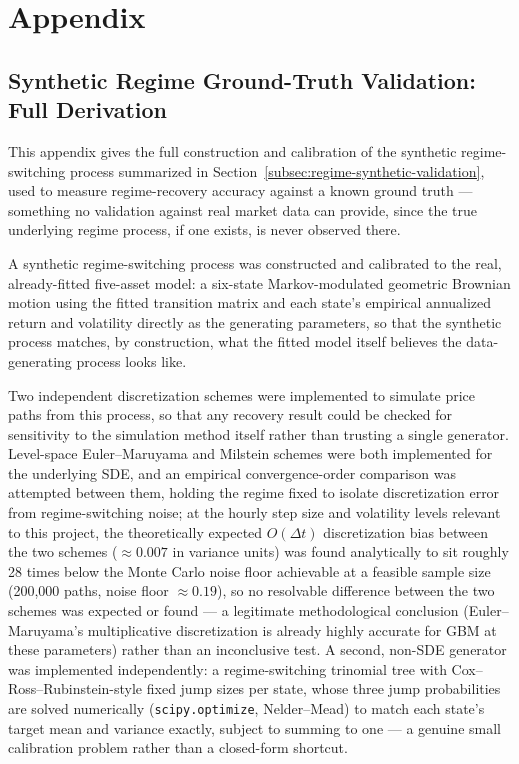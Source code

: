 \chapter{Appendix}
\label{chap:appendix}

\section{Synthetic Regime Ground-Truth Validation: Full Derivation}
\label{app:synthetic-validation}

This appendix gives the full construction and calibration of the synthetic regime-switching process summarized in Section~\ref{subsec:regime-synthetic-validation}, used to measure regime-recovery accuracy against a known ground truth --- something no validation against real market data can provide, since the true underlying regime process, if one exists, is never observed there.

A synthetic regime-switching process was constructed and calibrated to the real, already-fitted five-asset model: a six-state Markov-modulated geometric Brownian motion using the fitted transition matrix and each state's empirical annualized return and volatility directly as the generating parameters, so that the synthetic process matches, by construction, what the fitted model itself believes the data-generating process looks like.

Two independent discretization schemes were implemented to simulate price paths from this process, so that any recovery result could be checked for sensitivity to the simulation method itself rather than trusting a single generator. Level-space Euler--Maruyama and Milstein schemes were both implemented for the underlying SDE, and an empirical convergence-order comparison was attempted between them, holding the regime fixed to isolate discretization error from regime-switching noise; at the hourly step size and volatility levels relevant to this project, the theoretically expected $O(\Delta t)$ discretization bias between the two schemes ($\approx 0.007$ in variance units) was found analytically to sit roughly 28 times below the Monte Carlo noise floor achievable at a feasible sample size (200{,}000 paths, noise floor $\approx 0.19$), so no resolvable difference between the two schemes was expected or found --- a legitimate methodological conclusion (Euler--Maruyama's multiplicative discretization is already highly accurate for GBM at these parameters) rather than an inconclusive test. A second, non-SDE generator was implemented independently: a regime-switching trinomial tree with Cox--Ross--Rubinstein-style fixed jump sizes per state, whose three jump probabilities are solved numerically (\texttt{scipy.optimize}, Nelder--Mead) to match each state's target mean and variance exactly, subject to summing to one --- a genuine small calibration problem rather than a closed-form shortcut.

